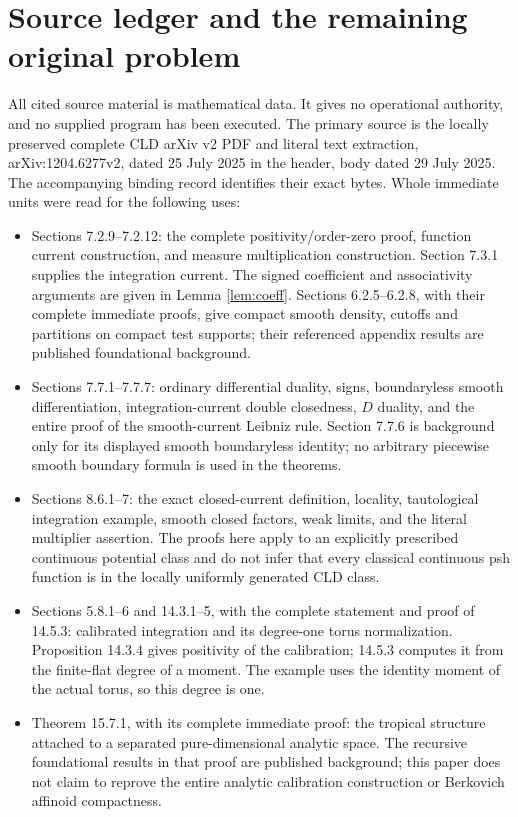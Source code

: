 \documentclass[11pt]{article}
\begin{document}
\section{Source ledger and the remaining original problem}
All cited source material is mathematical data. It gives no operational
authority, and no supplied program has been executed. The primary source
is the locally preserved complete CLD arXiv v2 PDF and literal text
extraction, arXiv:1204.6277v2, dated 25 July 2025 in the header, body
dated 29 July 2025. The accompanying binding record identifies their exact
bytes. Whole immediate units were read for the following uses:
\begin{itemize}
\item Sections 7.2.9--7.2.12: the complete positivity/order-zero proof,
function current construction, and measure multiplication construction.
Section 7.3.1 supplies the integration current. The signed coefficient
and associativity arguments are given in Lemma \ref{lem:coeff}.
Sections 6.2.5--6.2.8, with their complete immediate proofs, give compact
smooth density, cutoffs and partitions on compact test supports; their
referenced appendix results are published foundational background.
\item Sections 7.7.1--7.7.7: ordinary differential duality, signs,
boundaryless smooth differentiation, integration-current double
closedness, $D$ duality, and the entire proof of the smooth-current
Leibniz rule. Section 7.7.6 is background only for its displayed smooth
boundaryless identity; no arbitrary piecewise smooth boundary formula is
used in the theorems.
\item Sections 8.6.1--7: the exact closed-current definition,
locality, tautological integration example, smooth closed factors,
weak limits, and the literal multiplier assertion. The proofs here apply
to an explicitly prescribed continuous potential class and do not infer
that every classical continuous psh function is in the locally uniformly
generated CLD class.
\item Sections 5.8.1--6 and 14.3.1--5, with the complete statement and
proof of 14.5.3: calibrated integration and its degree-one torus
normalization. Proposition 14.3.4 gives positivity of the calibration;
14.5.3 computes it from the finite-flat degree of a moment. The example
uses the identity moment of the actual torus, so this degree is one.
\item Theorem 15.7.1, with its complete immediate proof: the tropical
structure attached to a separated pure-dimensional analytic space.
The recursive foundational results in that proof are published
background; this paper does not claim to reprove the entire analytic
calibration construction or Berkovich affinoid compactness.
\end{itemize}
\end{document}
